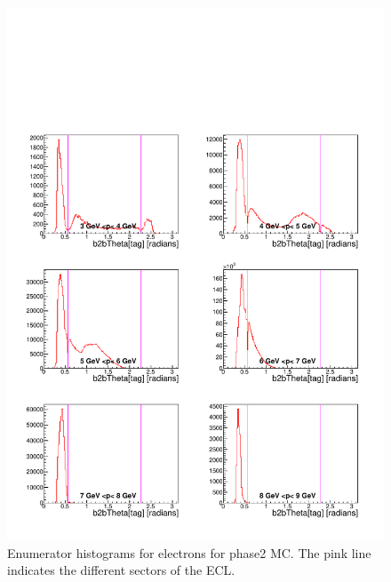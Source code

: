 \documentclass[a4paper,11pt,twosided,final,german,openbib,pdftex,listof=totoc,bibliography=totoc]{scrbook}
\begin{document}
\begin{appendix}
\begin{figure}[!htbp]
	\centering
	\includegraphics[width=\textwidth]{Plots/master/xPMThetaemE_MC}
	\caption[Momentum $\theta$ Electron Enumerator Histogram Phase2 MC]{Enumerator histograms for electrons for phase2 MC. The pink line indicates the different sectors of the ECL.}
	\label{plt:PMThetaemE_MC}
\end{figure}


\end{appendix}
\end{document}
